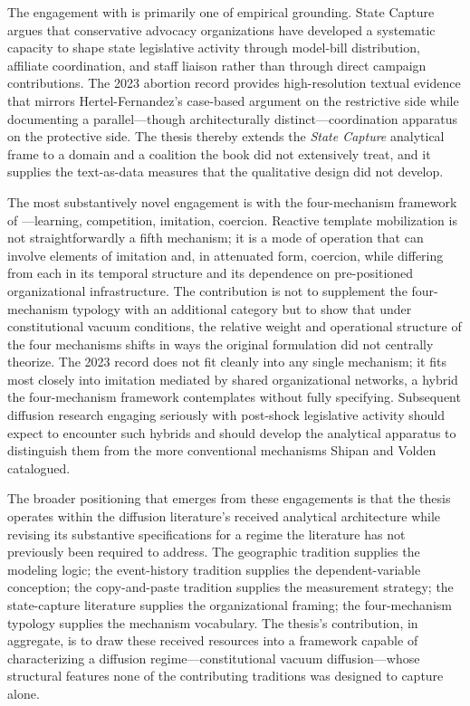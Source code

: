 The engagement with \textcite{hertel-fernandezStateCapture2019} is primarily one of empirical grounding. State Capture argues that conservative advocacy organizations have developed a systematic capacity to shape state legislative activity through model-bill distribution, affiliate coordination, and staff liaison rather than through direct campaign contributions. The 2023 abortion record provides high-resolution textual evidence that mirrors Hertel-Fernandez's case-based argument on the restrictive side while documenting a parallel---though architecturally distinct---coordination apparatus on the protective side. The thesis thereby extends the \textit{State Capture} analytical frame to a domain and a coalition the book did not extensively treat, and it supplies the text-as-data measures that the qualitative design did not develop.
 
The most substantively novel engagement is with the four-mechanism framework of \textcite{shipanMechanismsPolicyDiffusion2008a}---learning, competition, imitation, coercion. Reactive template mobilization is not straightforwardly a fifth mechanism; it is a mode of operation that can involve elements of imitation and, in attenuated form, coercion, while differing from each in its temporal structure and its dependence on pre-positioned organizational infrastructure. The contribution is not to supplement the four-mechanism typology with an additional category but to show that under constitutional vacuum conditions, the relative weight and operational structure of the four mechanisms shifts in ways the original formulation did not centrally theorize. The 2023 record does not fit cleanly into any single mechanism; it fits most closely into imitation mediated by shared organizational networks, a hybrid the four-mechanism framework contemplates without fully specifying. Subsequent diffusion research engaging seriously with post-shock legislative activity should expect to encounter such hybrids and should develop the analytical apparatus to distinguish them from the more conventional mechanisms Shipan and Volden catalogued.
 
The broader positioning that emerges from these engagements is that the thesis operates within the diffusion literature's received analytical architecture while revising its substantive specifications for a regime the literature has not previously been required to address. The geographic tradition supplies the modeling logic; the event-history tradition supplies the dependent-variable conception; the copy-and-paste tradition supplies the measurement strategy; the state-capture literature supplies the organizational framing; the four-mechanism typology supplies the mechanism vocabulary. The thesis's contribution, in aggregate, is to draw these received resources into a framework capable of characterizing a diffusion regime---constitutional vacuum diffusion---whose structural features none of the contributing traditions was designed to capture alone.
 
